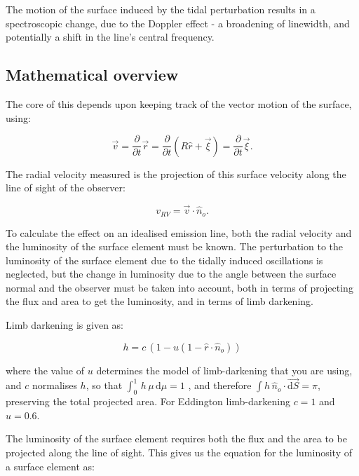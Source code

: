 \documentclass[11pt]{amsart}
\begin{document}
The motion of the surface induced by the tidal perturbation results in a spectroscopic change, due to the Doppler effect - a broadening of linewidth, and potentially a shift in the line's central frequency.

\subsection{Mathematical overview} \label{RV_overview}

The core of this depends upon keeping track of the vector motion of the surface, using:

\begin{equation}
\vec{v} = \frac{\partial}{\partial t} \vec{r} = \frac{\partial}{\partial t} ( R \hat{r} + \vec{\xi} ) = \frac{\partial}{\partial t} \vec{\xi} .
\end{equation}

The radial velocity measured is the projection of this surface velocity along the line of sight of the observer:

\begin{equation}
v_{RV} = \vec{v} \cdot \hat{n}_{o}.
\end{equation}

To calculate the effect on an idealised emission line, both the radial velocity and the luminosity of the surface element must be known.  The perturbation to the luminosity of the surface element due to the tidally induced oscillations is neglected, but the change in luminosity due to the angle between the surface normal and the observer must be taken into account, both in terms of projecting the flux and area to get the luminosity, and in terms of limb darkening.

Limb darkening is given as:

\begin{equation}
h = c \, ( 1 - u (1 - \hat{r} \! \cdot \! \hat{n}_{o}) )
\end{equation}

where the value of $u$ determines the model of limb-darkening that you are using, and $c$ normalises $h$, so that $\int_{0}^{1} \, h \, \mu \, \text{d}\mu = 1$ \cite{Pfahl2008}, and therefore $\int h \, \hat{n}_{o} \! \cdot \! \vec{\text{d} S} = \pi$, preserving the total projected area.  For Eddington limb-darkening $c = 1$ and $u = 0.6$.

The luminosity of the surface element requires both the flux and the area to be projected along the line of sight.  This gives us the equation for the luminosity of a surface element \cite{Pfahl2008} as:
\end{document}
